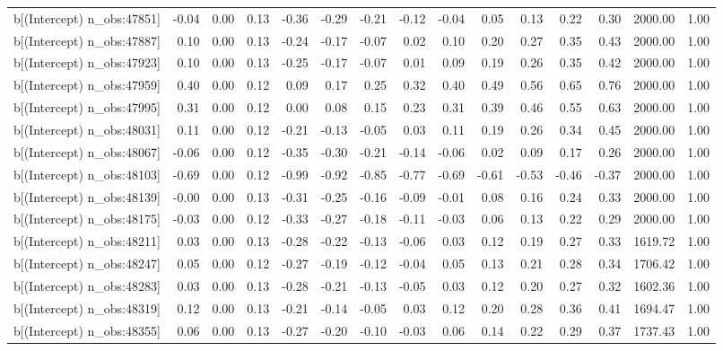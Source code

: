 \begin{table}[ht]
\begin{tabular}{rrrrrrrrrrrrrrr}
  b[(Intercept) n\_obs:47851] & -0.04 & 0.00 & 0.13 & -0.36 & -0.29 & -0.21 & -0.12 & -0.04 & 0.05 & 0.13 & 0.22 & 0.30 & 2000.00 & 1.00 \\ 
  b[(Intercept) n\_obs:47887] & 0.10 & 0.00 & 0.13 & -0.24 & -0.17 & -0.07 & 0.02 & 0.10 & 0.20 & 0.27 & 0.35 & 0.43 & 2000.00 & 1.00 \\ 
  b[(Intercept) n\_obs:47923] & 0.10 & 0.00 & 0.13 & -0.25 & -0.17 & -0.07 & 0.01 & 0.09 & 0.19 & 0.26 & 0.35 & 0.42 & 2000.00 & 1.00 \\ 
  b[(Intercept) n\_obs:47959] & 0.40 & 0.00 & 0.12 & 0.09 & 0.17 & 0.25 & 0.32 & 0.40 & 0.49 & 0.56 & 0.65 & 0.76 & 2000.00 & 1.00 \\ 
  b[(Intercept) n\_obs:47995] & 0.31 & 0.00 & 0.12 & 0.00 & 0.08 & 0.15 & 0.23 & 0.31 & 0.39 & 0.46 & 0.55 & 0.63 & 2000.00 & 1.00 \\ 
  b[(Intercept) n\_obs:48031] & 0.11 & 0.00 & 0.12 & -0.21 & -0.13 & -0.05 & 0.03 & 0.11 & 0.19 & 0.26 & 0.34 & 0.45 & 2000.00 & 1.00 \\ 
  b[(Intercept) n\_obs:48067] & -0.06 & 0.00 & 0.12 & -0.35 & -0.30 & -0.21 & -0.14 & -0.06 & 0.02 & 0.09 & 0.17 & 0.26 & 2000.00 & 1.00 \\ 
  b[(Intercept) n\_obs:48103] & -0.69 & 0.00 & 0.12 & -0.99 & -0.92 & -0.85 & -0.77 & -0.69 & -0.61 & -0.53 & -0.46 & -0.37 & 2000.00 & 1.00 \\ 
  b[(Intercept) n\_obs:48139] & -0.00 & 0.00 & 0.13 & -0.31 & -0.25 & -0.16 & -0.09 & -0.01 & 0.08 & 0.16 & 0.24 & 0.33 & 2000.00 & 1.00 \\ 
  b[(Intercept) n\_obs:48175] & -0.03 & 0.00 & 0.12 & -0.33 & -0.27 & -0.18 & -0.11 & -0.03 & 0.06 & 0.13 & 0.22 & 0.29 & 2000.00 & 1.00 \\ 
  b[(Intercept) n\_obs:48211] & 0.03 & 0.00 & 0.13 & -0.28 & -0.22 & -0.13 & -0.06 & 0.03 & 0.12 & 0.19 & 0.27 & 0.33 & 1619.72 & 1.00 \\ 
  b[(Intercept) n\_obs:48247] & 0.05 & 0.00 & 0.12 & -0.27 & -0.19 & -0.12 & -0.04 & 0.05 & 0.13 & 0.21 & 0.28 & 0.34 & 1706.42 & 1.00 \\ 
  b[(Intercept) n\_obs:48283] & 0.03 & 0.00 & 0.13 & -0.28 & -0.21 & -0.13 & -0.05 & 0.03 & 0.12 & 0.20 & 0.27 & 0.32 & 1602.36 & 1.00 \\ 
  b[(Intercept) n\_obs:48319] & 0.12 & 0.00 & 0.13 & -0.21 & -0.14 & -0.05 & 0.03 & 0.12 & 0.20 & 0.28 & 0.36 & 0.41 & 1694.47 & 1.00 \\ 
  b[(Intercept) n\_obs:48355] & 0.06 & 0.00 & 0.13 & -0.27 & -0.20 & -0.10 & -0.03 & 0.06 & 0.14 & 0.22 & 0.29 & 0.37 & 1737.43 & 1.00 \\ 

\end{tabular}
\end{table}

